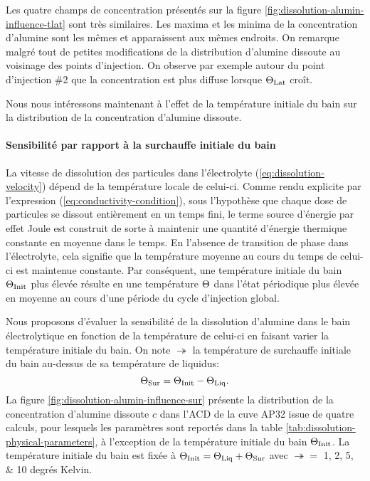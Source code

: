 Les quatre champs de concentration présentés sur la figure
\ref{fig:dissolution-alumin-influence-tlat} sont très similaires. Les
maxima et les minima de la concentration d'alumine
sont les mêmes et apparaissent aux mêmes endroits. On remarque
malgré tout de petites modifications de la distribution d'alumine
dissoute au voisinage des points d'injection. On observe par exemple
autour du point d'injection \#2 que la concentration est plus diffuse
lorsque $\Theta_\text{Lat}$ croît.

Nous nous intéressons maintenant à l'effet de la température
initiale du bain sur la distribution de la concentration d'alumine dissoute.

\paragraph{Sensibilité par rapport à la surchauffe initiale du bain}
La vitesse de dissolution des particules dans l'électrolyte
(\ref{eq:dissolution-velocity}) dépend de la température locale de
celui-ci. Comme rendu explicite par l'expression
(\ref{eq:conductivity-condition}), sous l'hypothèse que chaque dose de
particules se dissout entièrement en un temps fini, le terme source
d'énergie par effet Joule est construit de sorte à maintenir une
quantité d'énergie thermique constante en moyenne dans le temps. En
l'absence de transition de phase dans l'électrolyte, cela signifie que
la température moyenne au cours du temps de celui-ci est maintenue
constante. Par conséquent, une température initiale du bain $\Theta_\text{Init}$
plus élevée résulte en une température $\Theta$ dans l'état
périodique plus élevée en moyenne au cours d'une période
du cycle d'injection global.



Nous proposons d'évaluer la sensibilité de la dissolution d'alumine
dans le bain électrolytique en fonction de la température de celui-ci
en faisant varier la température initiale du bain. On note $\tsur$ la
température de surchauffe initiale du bain au-dessus de sa température de
liquidus:
\begin{equation}
  \Theta_\text{Sur} = \Theta_\text{Init} - \Theta_\text{Liq}.
\end{equation}
La figure \ref{fig:dissolution-alumin-influence-sur} présente la distribution
de la concentration d'alumine dissoute $c$ dans l'ACD de la cuve AP32
issue de quatre calculs, pour lesquels les paramètres sont reportés
dans la table \ref{tab:dissolution-physical-parameters}, à
l'exception de la température initiale du bain $\Theta_\text{Init}$. La
température initiale du bain est fixée à $\Theta_\text{Init} = \Theta_\text{Liq} + \Theta_\text{Sur}$ avec $\tsur = $ \numlist{1;2;5;10} degrés Kelvin.


